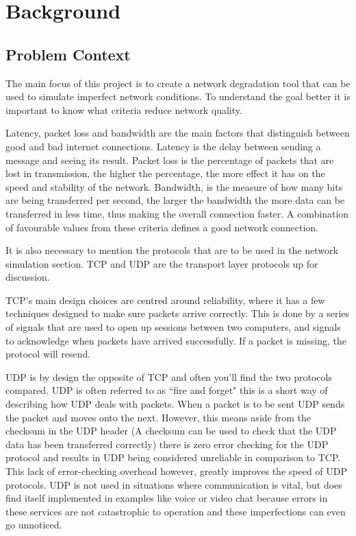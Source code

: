 \chapter{Background}

\section{Problem Context}
The main focus of this project is to create a network degradation tool that can be used to simulate imperfect network conditions. To understand the goal better it is important to know what criteria reduce network quality.

Latency, packet loss and bandwidth are the main factors that distinguish between good and bad internet connections. Latency is the delay between sending a message and seeing its result. Packet loss is the percentage of packets that are lost in transmission, the higher the percentage, the more effect it has on the speed and stability of the network. Bandwidth, is the measure of how many bits are being transferred per second, the larger the bandwidth the more data can be transferred in less time, thus making the overall connection faster. A combination of favourable values from these criteria defines a good network connection.

It is also necessary to mention the protocols that are to be used in the network simulation section. TCP \citep{TCP} and UDP \citep{UDP} are the transport layer protocols up for discussion. 

TCP's main design choices are centred around reliability, where it has a few techniques designed to make sure packets arrive correctly. This is done by a series of signals that are used to open up sessions between two computers, and signals to acknowledge when packets have arrived successfully. If a packet is missing, the protocol will resend.

UDP is by design the opposite of TCP and often you'll find the two protocols compared. UDP is often referred to as ``fire and forget" \citep{kempf2011thoughts} this is a short way of describing how UDP deals with packets. When a packet is to be sent UDP sends the packet and moves onto the next. However, this means aside from the checksum in the UDP header (A checksum can be used to check that the UDP data has been transferred correctly) there is zero error checking for the UDP protocol and results in UDP being considered unreliable in comparison to TCP. This lack of error-checking overhead however, greatly improves the speed of UDP protocols. UDP is not used in situations where communication is vital, but does find itself implemented in examples like voice or video chat because errors in these services are not catastrophic to operation and these imperfections can even go unnoticed. 

